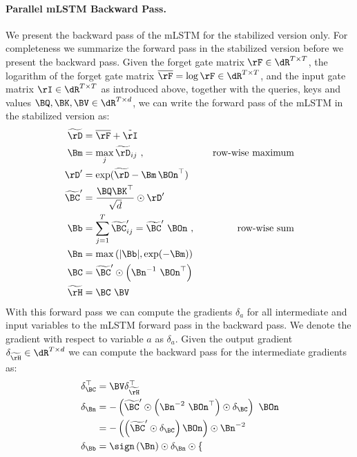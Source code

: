 \documentclass[dvipsnames]{article}
\begin{document}
\begin{appendix}
\paragraph{Parallel mLSTM Backward Pass.}
We present the backward pass of the mLSTM for the stabilized version only.
For completeness we summarize the forward pass in the stabilized version before we present the backward pass.
Given the forget gate matrix $\bm{\rF} \in \dR^{T \times T}$,
the logarithm of the forget gate matrix $\overline{\bm{\rF}} = \log \bm{\rF} \in \dR^{T \times T}$,
and the input gate matrix $\bm{\rI} \in \dR^{T \times T}$ as introduced above,
together with the queries, keys and values $\BQ, \BK, \BV \in \dR^{T \times d}$, we can write the forward pass of the mLSTM
in the stabilized version as:
\begin{alignat}{2}
    \widetilde{\bm{\rD}} &= \overline{\bm{\rF}} + \tilde{\bm{\rI}} \\
    \Bm &= \max_j \widetilde{\bm{\rD}}_{ij} \ , \quad &\text{row-wise maximum} \\
    \bm{\rD}' &= \exp(\widetilde{\bm{\rD}} - \Bm \, \BOn^\top) \\
    \widetilde{\BC}' &= \frac{\BQ \BK^\top}{\sqrt{d}} \odot \bm{\rD}' \\
    \Bb &= \sum_{j=1}^{T} \widetilde{\BC}'_{ij} = \widetilde{\BC}' \ \BOn \ , \quad &\text{row-wise sum} \\
    \Bn &= \max \left( |\Bb|, \exp(-\Bm) \right) \\
    \BC &= \widetilde{\BC}' \odot \left( \Bn^{-1} \ \BOn^\top \right) \\
    \widetilde{\bm{\rH}} &= \BC \ \BV
\end{alignat}
With this forward pass we can compute the gradients $\delta_a$ for all intermediate and input variables to the mLSTM forward pass
in the backward pass. We denote the gradient with respect to variable $a$ as $\delta_a$.
Given the output gradient $\delta_{\widetilde{\bm{\rH}}} \in \dR^{T \times d}$ we can compute the backward pass for the intermediate gradients as:
\begin{alignat}{2}
    \delta_{\BC}^\top &= \BV \delta_{\widetilde{\bm{\rH}}}^\top \\
    \delta_{\Bn} &=-\left(\widetilde{\BC}' \odot \left(\Bn^{-2} \ \BOn^\top \right)\odot \delta_{\BC} \right) \ \BOn \\
                 &= - \left( \left( \widetilde{\BC}' \odot \delta_{\BC} \right) \BOn \right) \odot \Bn^{-2} \\
    \delta_{\Bb} &= \sign \left( \Bn \right) \odot \delta_{\Bn} \odot \begin{cases}

\end{cases}
\end{alignat}
\end{appendix}
\end{document}
